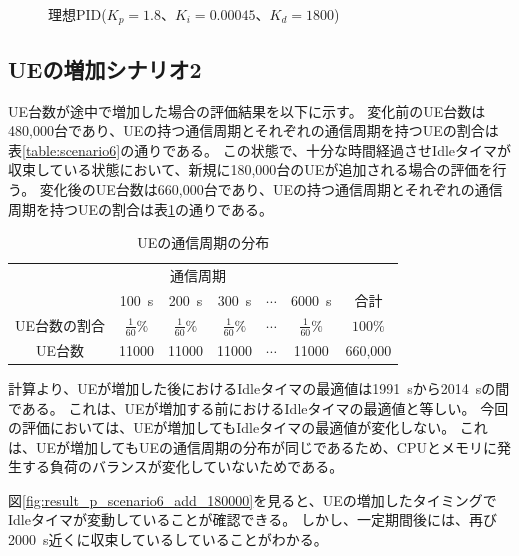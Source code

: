 \documentclass[a4j]{ujarticle}
\begin{document}
\begin{figure}[htbp]
\begin{subfigure}{0.49\hsize}
   \label{subfig:scenario_6_stateBreakdown_345600_691200_1-8_0-00045_1800_0_ideal_add_80000}
 \end{subfigure}
 \caption{理想PID($K_p = 1.8、K_i = 0.00045、K_d = 1800$)}
 \label{fig:result_pid_scenario6_add_80000}
\end{figure}


\clearpage
\subsection{UEの増加シナリオ2}
UE台数が途中で増加した場合の評価結果を以下に示す。
変化前のUE台数は480,000台であり、UEの持つ通信周期とそれぞれの通信周期を持つUEの割合は表\ref{table:scenario6}の通りである。
この状態で、十分な時間経過させIdleタイマが収束している状態において、新規に180,000台のUEが追加される場合の評価を行う。
変化後のUE台数は660,000台であり、UEの持つ通信周期とそれぞれの通信周期を持つUEの割合は表\ref{table:scenario6_add_180000}の通りである。
\begin{table}[htbp]
  \centering
  \caption{UEの通信周期の分布}
  \label{table:scenario6_add_180000}
  \begin{tabular}{c|ccccc|c}
    \hline
    &\multicolumn{4}{c}{通信周期}& \\
    & 100~s & 200~s & 300~s & $\cdots$ & 6000~s & 合計\\\hline \hline
    UE台数の割合 & $\frac{1}{60}\%$ & $\frac{1}{60}\%$ & $\frac{1}{60}\%$ & $\cdots$ &$\frac{1}{60}\%$ & $100\%$ \\
    UE台数 & 11000 & 11000 & 11000 & $\cdots$ & 11000 & 660,000 \\\hline
  \end{tabular}
\end{table}

計算より、UEが増加した後におけるIdleタイマの最適値は1991~sから2014~sの間である。
これは、UEが増加する前におけるIdleタイマの最適値と等しい。
今回の評価においては、UEが増加してもIdleタイマの最適値が変化しない。
これは、UEが増加してもUEの通信周期の分布が同じであるため、CPUとメモリに発生する負荷のバランスが変化していないためである。

図\ref{fig:result_p_scenario6_add_180000}を見ると、UEの増加したタイミングでIdleタイマが変動していることが確認できる。
しかし、一定期間後には、再び2000~s近くに収束しているしていることがわかる。
\end{document}
